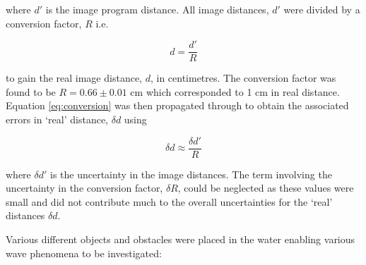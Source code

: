 \documentclass{article}
\begin{document}
\vspace{2mm}
\noindent
where $d'$ is the image program distance. All image distances, $d'$ were divided by a conversion factor, $R$ i.e.

\vspace{2mm}
\noindent
\begin{equation}
\label{eq:conversion}
d = \frac{d'}{R}
\end{equation}

\vspace{2mm}
\noindent
to gain the real image distance, $d$, in centimetres. The conversion factor was found to be $R = 0.66 \pm 0.01$ cm which corresponded to 1 cm in real distance. Equation \eqref{eq:conversion} was then propagated through to obtain the associated errors in `real' distance, $\delta d$ using

\vspace{2mm}
\noindent
\begin{equation}
\label{eq:conversion-error}
\delta d \approx \frac{\delta d'}{R}
\end{equation}

\vspace{2mm}
\noindent
where $\delta d'$ is the uncertainty in the image distances. The term involving the uncertainty in the conversion factor, $\delta R$, could be neglected as these values were small and did not contribute much to the overall uncertainties for the `real' distances $\delta d$.

\vspace{2mm}
\noindent
Various different objects and obstacles were placed in the water enabling various wave phenomena to be investigated:
\end{document}
